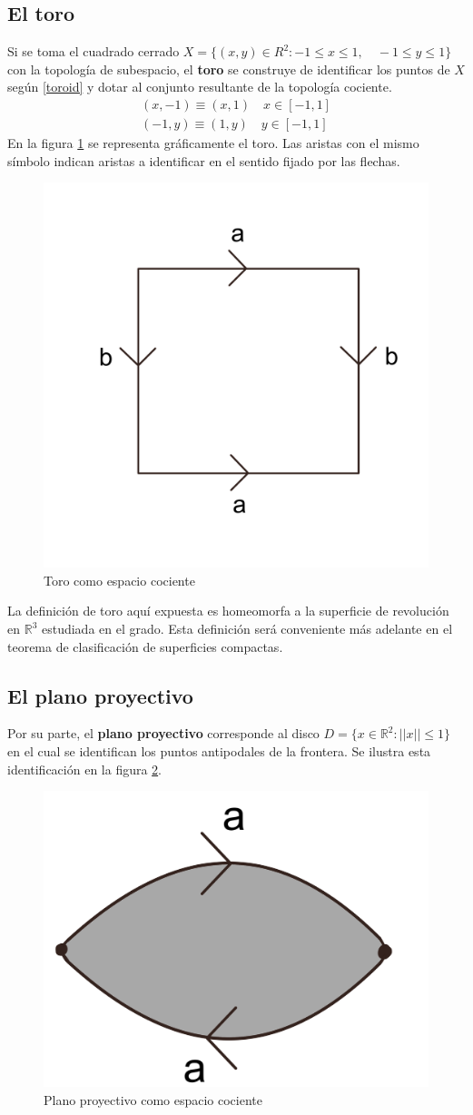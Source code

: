 \documentclass[a4paper,11pt,spanish, twoside, leqno]{tfg-uam}
\newcommand*{\reales}{\mathbb{R}}
\theoremstyle{definition}
\begin{document}
\subsection*{El toro}
Si se toma el cuadrado cerrado $ X = \{ (x,y) \in R^2: -1\leq x\leq 1,\quad -1\leq y \leq 1  \} $ con la topología de subespacio, el \textbf{toro}  se construye de identificar los puntos de  $ X $ según  \ref{toroid} y dotar al conjunto resultante de la topología cociente.
\begin{align}\label{toroid}
	(x,-1)\equiv(x,1) \quad x\in [-1,1]  \\
	(-1,y)\equiv(1,y) \quad y\in [-1,1] \nonumber
\end{align}
En la figura \ref{fig:toro expresion canonica} se representa gráficamente el toro. Las aristas con el mismo símbolo indican aristas a identificar en el sentido fijado por las flechas.
\begin{figure}[h!]
	\centering
	\includegraphics[width=0.2\linewidth]{imagenes/toroplano.png}
	\caption{Toro como espacio cociente}
	\label{fig:toro expresion canonica}
\end{figure} 

La definición de toro aquí expuesta es homeomorfa a la superficie de revolución en $\reales^3$ estudiada en el grado. Esta definición será conveniente más adelante en el teorema de clasificación de superficies compactas.

\subsection*{El plano proyectivo}
Por su parte, el \textbf{plano proyectivo} corresponde al disco $ D = \{x\in\mathbb{R}^2: ||x||\leq1 \} $ en el cual se identifican los puntos antipodales de la frontera. Se ilustra esta identificación en la figura \ref{fig:planoproyectivo expresión canónica}.

\begin{figure}[h!]
	\centering
	\includegraphics[width=0.3\linewidth]{imagenes/planop_plano.png}
	\caption{Plano proyectivo como espacio cociente}
	\label{fig:planoproyectivo expresión canónica}
\end{figure} 
\end{document}
